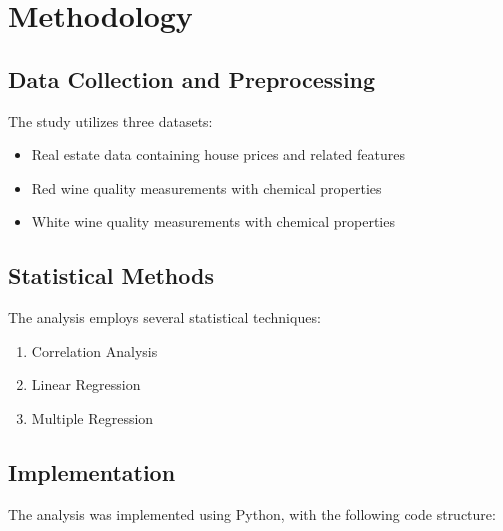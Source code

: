 \section{Methodology}
\subsection{Data Collection and Preprocessing}
The study utilizes three datasets:
\begin{itemize}
    \item Real estate data containing house prices and related features
    \item Red wine quality measurements with chemical properties
    \item White wine quality measurements with chemical properties
\end{itemize}

\subsection{Statistical Methods}
The analysis employs several statistical techniques:
\begin{enumerate}
    \item Correlation Analysis
    \item Linear Regression
    \item Multiple Regression
\end{enumerate}

\subsection{Implementation}
The analysis was implemented using Python, with the following code structure:



 